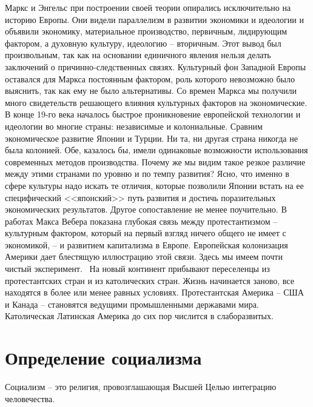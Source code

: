 \documentclass{book}
\begin{document}
Маркс и Энгельс при построении своей теории опирались исключительно на историю Европы. Они видели параллелизм в развитии экономики и идеологии и объявили экономику, материальное производство, первичным, лидирующим фактором, а духовную культуру, идеологию -- вторичным. Этот вывод был произвольным, так как на основании единичного явле­ния нельзя делать заключений о причинно-следственных связях. Культурный фон Западной Европы оставался для Маркса постоянным фактором, роль которого невозможно было выяснить, так как ему не было альтернативы. Со времен Маркса мы получили много свидетельств решающего влияния культурных факторов на экономические. В конце 19-го века началось быстрое проникновение европейской технологии и идеологии во многие страны: независимые и колониальные. Сравним экономическое развитие Японии и Турции. Ни та, ни другая страна никогда не была колонией. Обе, казалось бы, имели оди­наковые возможности использования современных методов производства. Почему же мы видим такое резкое различие между 
этими странами по уровню и по темпу развития? Ясно, что именно в сфере культуры надо искать те отличия, которые позволили Японии встать на ее специфический <<японский>> путь развития и достичь поразительных экономических резуль­татов. Другое сопоставление не менее поучительно. В работах Макса Вебера показана глубокая связь между протестантиз­мом -- культурным фактором, который на первый взгляд ничего общего не имеет с экономикой, -- и развитием капита­лизма в Европе. Европейская колонизация Америки дает блес­тящую иллюстрацию этой связи. Здесь мы имеем почти чистый эксперимент.  На новый континент прибывают переселенцы из протестантских стран и из католических стран. Жизнь на­чинается заново, все находятся в более или менее равных усло­виях. Протестантская Америка -- США и Канада -- становятся ведущими промышленными державами мира. Католическая Латинская Америка до сих пор числится в слаборазвитых.


\section{Определение социализма}

Социализм -- это религия, провозглашающая Высшей Целью интеграцию человечества.
\end{document}
